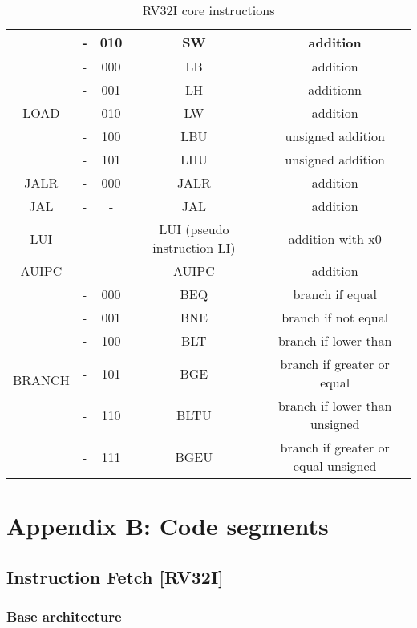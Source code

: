 \begin{table}[ht]
\begin{center}
\begin{tabular}{|c|c|c|c|c|}
            & - & 010 & SW & addition\\
            \hline
            \multirow{5}{*}{LOAD} & - & 000 & LB & addition\\
            & - & 001 & LH & additionn\\
            & - & 010 & LW & addition\\
            & - & 100 & LBU & unsigned addition\\
            & - & 101 & LHU & unsigned addition\\
            \hline
            JALR & - & 000 & JALR & addition\\
            \hline
            JAL & - & - & JAL & addition\\
            \hline
            LUI & - & - & LUI (pseudo instruction LI) & addition with x0\\
            \hline
            AUIPC & - & - & AUIPC & addition\\
            \hline
            \multirow{6}{*}{BRANCH} & - & 000 & BEQ & branch if equal\\
            & - & 001 & BNE & branch if not equal\\
            & - & 100 & BLT & branch if lower than\\
            & - & 101 & BGE & branch if greater or equal\\
            & - & 110 & BLTU & branch if lower than unsigned\\
            & - & 111 & BGEU & branch if greater or equal unsigned\\
            \hline
        \end{tabular}
        \caption{RV32I core instructions}
        \label{table:core_instr}
    \end{center}
\end{table}

\section{Appendix B: Code segments}

\subsection{Instruction Fetch [RV32I]}

\subsubsection{Base architecture}
\begin{code}
\label{code:IF_code}   
\inputminted[fontsize=\footnotesize]{vhdl}{\srcfolder instr_fetch.vhd}
\end{code}
\newpage


